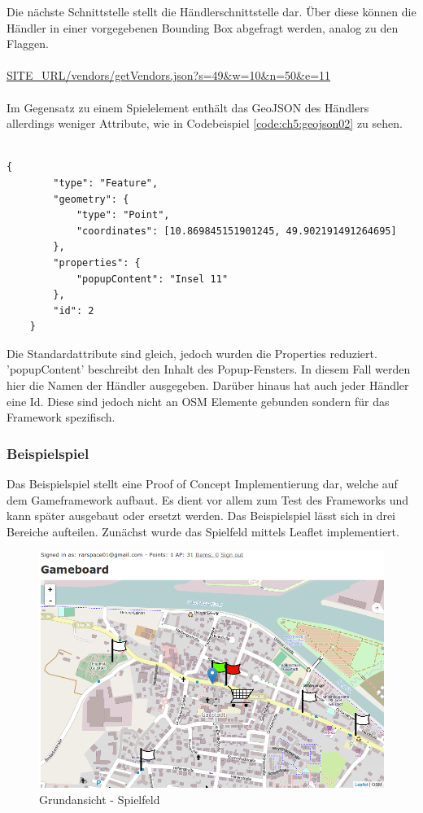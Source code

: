 Die nächste Schnittstelle stellt die Händlerschnittstelle dar. Über diese können die Händler in einer vorgegebenen Bounding Box abgefragt werden, analog zu den Flaggen.
\\\\
\url{SITE\_URL/vendors/getVendors.json?s=49&w=10&n=50&e=11}
\\\\
Im Gegensatz zu einem Spielelement enthält das GeoJSON des Händlers allerdings weniger Attribute, wie in Codebeispiel \ref{code:ch5:geojson02} zu sehen.
\\\\
\begin{lstlisting}[caption=GeoJSON Response Vendor (Reduziert), label=code:ch5:geojson02]
{
        "type": "Feature",
        "geometry": {
            "type": "Point",
            "coordinates": [10.869845151901245, 49.902191491264695]
        },
        "properties": {
            "popupContent": "Insel 11"
        },
        "id": 2
    }
\end{lstlisting}

Die Standardattribute sind gleich, jedoch wurden die Properties reduziert. 'popupContent' beschreibt den Inhalt des Popup-Fensters. In diesem Fall werden hier die Namen der Händler ausgegeben. Darüber hinaus hat auch jeder Händler eine Id. Diese sind jedoch nicht an OSM Elemente gebunden sondern für das Framework spezifisch.

\subsubsection*{Beispielspiel}

Das Beispielspiel stellt eine Proof of Concept Implementierung dar, welche auf dem Gameframework aufbaut. Es dient vor allem zum Test des Frameworks und kann später ausgebaut oder ersetzt werden. Das Beispielspiel lässt sich in drei Bereiche aufteilen. Zunächst wurde das Spielfeld mittels Leaflet implementiert.

\begin{figure}[H]
\begin{center}
\includegraphics[width=150mm]{images/ch5_img09_gameboard.png}
\caption{Grundansicht - Spielfeld}
\label{img:ch5_img09_gameboard}
\end{center}
\end{figure}

